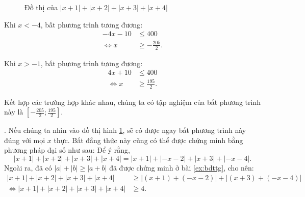 \begin{figure}[H]
	\centering
	\caption{Đồ thị của $|x + 1| + |x + 2| + |x + 3| + |x + 4|$}
   \label{fig:nen_tang_lo_gich:ham_so_mot_bien:ham_tung_phan:bdtkho_2}
\end{figure}

Khi $x < -4$, bất phương trình tương đương:
\begin{align*}
   -4x - 10 &\leq 400 \\
   \iff x &\geq -\frac{205}{2}.
\end{align*} 

Khi $x > -1$, bất phương trình tương đương:
\begin{align*}
   4x + 10 &\leq 400 \\
   \iff x &\geq \frac{195}{2}.
\end{align*}

Kết hợp các trường hợp khác nhau, chúng ta có tập nghiệm của bất phương trình này là $\left[ -\frac{205}{2}; \frac{195}{2} \right]$.

. Nếu chúng ta nhìn vào đồ thị hình \ref{fig:nen_tang_lo_gich:ham_so_mot_bien:ham_tung_phan:bdtkho_2}, sẽ có được ngay bất phương trình này đúng với mọi $x$ thực. Bất đẳng thức này cũng có thể được chứng minh bằng phương pháp đại số như sau: Để ý rằng,
$$
   |x + 1| + |x + 2| + |x + 3| + |x + 4| = |x + 1| + |-x - 2| + |x + 3| + |-x - 4|.
$$
Ngoài ra, đã có $|a| + |b| \geq |a + b|$ đã được chứng minh ở bài \ref{ex:bdttg}, cho nên:
\begin{align*}
|x + 1| + |x + 2| + |x + 3| + |x + 4| &\geq \left|(x + 1) + (-x - 2)\right| + \left|(x + 3) + (-x - 4)\right| \\
\iff |x + 1| + |x + 2| + |x + 3| + |x + 4| &\geq 4.
\end{align*}

